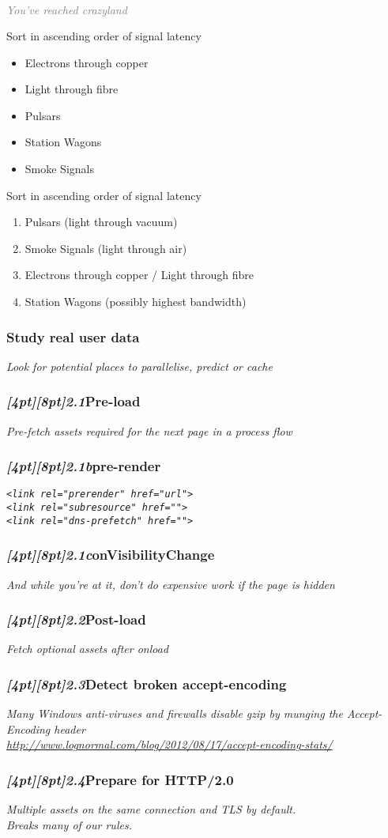 \documentclass{beamer}
\newcommand{\sn}[1]{\textrm{\textit{\Huge{\raisebox{-3pt}[4pt][8pt]{\textcolor{f2elblue}{#1}}}}}\hspace{4pt}}
\newcommand{\innersplash}[1]{
  \begin{center}
    \Large \textrm{\textit{ #1 } }
  \end{center}
}
\newcommand{\splashslide}[2][{}]{
  \begin{frame}
  \frametitle{#1}
  \innersplash{#2}
  \end{frame}
}
\newcommand{\leadinslide}[2]{
  \splashslide{
     {\fontsize{150}{20}\selectfont{\raisebox{0pt}[90pt][0pt]{\textcolor{light-gray}{#1}}}} \\ \huge \textcolor{gray}{#2}
  }
}
\begin{document}
\leadinslide{2}{You've reached crazyland}

\begin{frame}{Sort in ascending order of signal latency}
\begin{itemize}
  \item Electrons through copper
  \item Light through fibre
  \item Pulsars
  \item Station Wagons
  \item Smoke Signals
\end{itemize}
\end{frame}

\begin{frame}{Sort in ascending order of signal latency}
\begin{enumerate}
  \item Pulsars (light through vacuum)
  \item Smoke Signals (light through air)
  \item Electrons through copper / Light through fibre
  \item Station Wagons (possibly highest bandwidth)
\end{enumerate}
\end{frame}

\splashslide[Study real user data]{Look for potential places to parallelise, predict or cache}

\splashslide[\sn{2.1}Pre-load]{Pre-fetch assets required for the next page in a process flow}

\splashslide[\sn{2.1b}pre-render]{\texttt{<link rel="prerender" href="url">} \\ \vfill \texttt{<link rel="subresource" href="">} \\ \vfill \texttt{<link rel="dns-prefetch" href="">} }

\splashslide[\sn{2.1c}onVisibilityChange]{And while you're at it, don't do expensive work if the page is hidden}

\splashslide[\sn{2.2}Post-load]{Fetch optional assets after onload}

\splashslide[\sn{2.3}Detect broken accept-encoding]{Many Windows anti-viruses and firewalls disable gzip by munging the Accept-Encoding header \\ \vfill \href{http://www.lognormal.com/blog/2012/08/17/accept-encoding-stats/}{\small http://www.lognormal.com/blog/2012/08/17/accept-encoding-stats/}}

\splashslide[\sn{2.4}Prepare for HTTP/2.0]{Multiple assets on the same connection and TLS by default. \\ Breaks many of our rules.}
\end{document}

